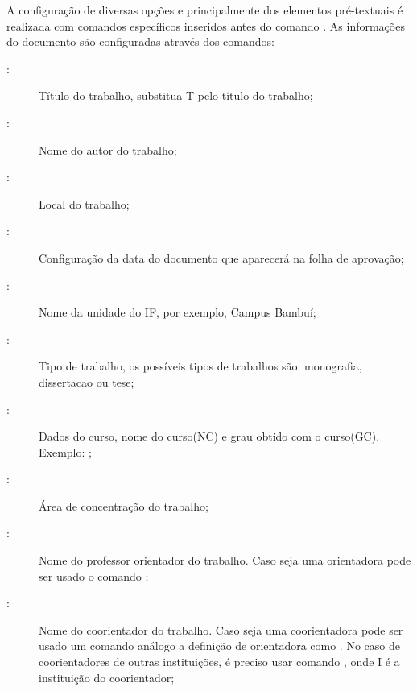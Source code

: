 A configuração de diversas opções e principalmente dos elementos pré-textuais é realizada com comandos específicos inseridos antes do comando . As informações do documento são configuradas através dos comandos:
\begin{description}
\item[:] Título do trabalho, substitua T pelo título do trabalho;
\item[:] Nome do autor do trabalho;
\item[:] Local do trabalho;
\item[:] Configuração da data do documento que aparecerá na folha de aprovação;
\item[:] Nome da unidade do IF, por exemplo, Campus Bambuí;
\item[:] Tipo de trabalho, os possíveis tipos de trabalhos são: monografia, dissertacao ou tese;
\item[:] Dados do curso, nome do curso(NC) e grau obtido com o curso(GC).
Exemplo: ;
\item[:] Área de concentração do trabalho;
\item[:] Nome do professor orientador do trabalho.
Caso seja uma orientadora pode ser usado o comando ;
\item[:] Nome do coorientador do trabalho.
Caso seja uma coorientadora pode ser usado um comando análogo a definição de orientadora como .
No caso de coorientadores de outras instituições, é preciso usar  comando , onde I é a instituição do coorientador;

\end{description}
